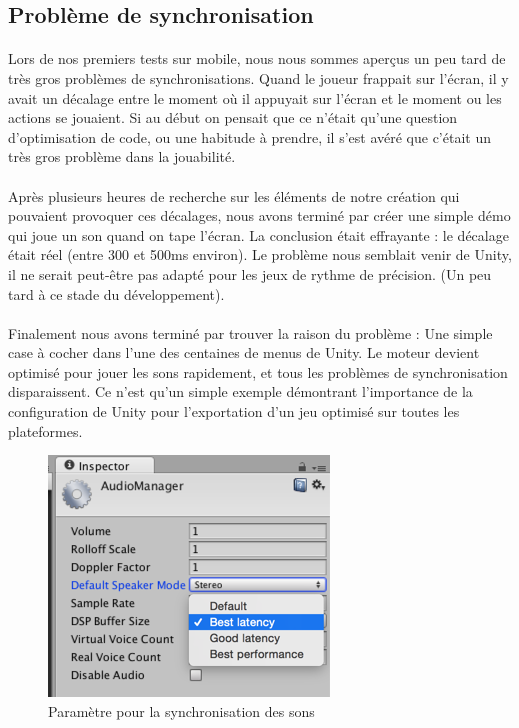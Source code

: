 \subsection{Problème de synchronisation}

\paragraph{}
Lors de nos premiers tests sur mobile, nous nous sommes aperçus un peu tard de très gros problèmes de synchronisations.
Quand le joueur frappait sur l'écran, il y avait un décalage entre le moment où il appuyait sur l'écran et le moment ou les actions se jouaient. Si au début on pensait que ce n'était qu'une question d'optimisation de code, ou une habitude à prendre, il s'est avéré que c'était un très gros problème dans la jouabilité.

\paragraph{}
Après plusieurs heures de recherche sur les éléments de notre création qui pouvaient provoquer ces décalages, nous avons terminé par créer une simple démo qui joue un son quand on tape l'écran. La conclusion était effrayante : le décalage était réel (entre 300 et 500ms environ). Le problème nous semblait venir de Unity, il ne serait peut-être pas adapté pour les jeux de rythme de précision. (Un peu tard à ce stade du développement).

\paragraph{}
Finalement nous avons terminé par trouver la raison du problème : Une simple case à cocher dans l'une des centaines de menus de Unity. Le moteur devient optimisé pour jouer les sons rapidement, et tous les problèmes de synchronisation disparaissent. Ce n'est qu'un simple exemple démontrant l'importance de la configuration de Unity pour l'exportation d'un jeu optimisé sur toutes les plateformes.

\begin{figure}[H]\centering
  \includegraphics[scale=1]{./img/opti_sound.png}
  \caption{Paramètre pour la synchronisation des sons}
\end{figure}

